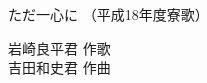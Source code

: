 \documentclass[10pt,b5j]{tarticle} %
\begin{document}
\begin{minipage}[c]{0.7\hsize} %
    \begin{center}
        {\LARGE
            ただ一心に %
        }
        {\small 
            （平成18年度寮歌） %
        }
    \end{center}
\end{minipage}
\begin{minipage}[c]{0.3\hsize} %
    \begin{flushright} %
        岩崎良平君 作歌\\吉田和史君 作曲 %
    \end{flushright}
\end{minipage}
\end{document}
